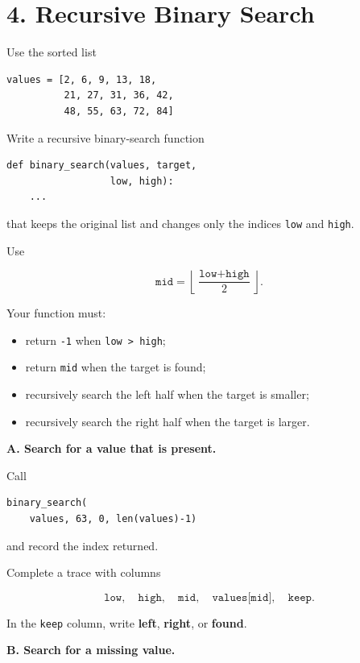 \documentclass[11pt]{article}
\begin{document}
\section*{4. Recursive Binary Search}

Use the sorted list

\begin{lstlisting}
values = [2, 6, 9, 13, 18,
          21, 27, 31, 36, 42,
          48, 55, 63, 72, 84]
\end{lstlisting}

Write a recursive binary-search function

\begin{lstlisting}
def binary_search(values, target,
                  low, high):
    ...
\end{lstlisting}

that keeps the original list and changes only the indices
\texttt{low} and \texttt{high}.

Use

\[
\texttt{mid}
=
\left\lfloor
\frac{\texttt{low}+\texttt{high}}{2}
\right\rfloor.
\]

Your function must:

\begin{itemize}
\item return \texttt{-1} when \texttt{low > high};
\item return \texttt{mid} when the target is found;
\item recursively search the left half when the target is smaller;
\item recursively search the right half when the target is larger.
\end{itemize}

\textbf{A. Search for a value that is present.}

Call

\begin{lstlisting}
binary_search(
    values, 63, 0, len(values)-1)
\end{lstlisting}

and record the index returned.

Complete a trace with columns

\[
\texttt{low},\quad
\texttt{high},\quad
\texttt{mid},\quad
\texttt{values[mid]},\quad
\texttt{keep}.
\]

In the \texttt{keep} column, write \textbf{left}, \textbf{right}, or
\textbf{found}.

\textbf{B. Search for a missing value.}
\end{document}
